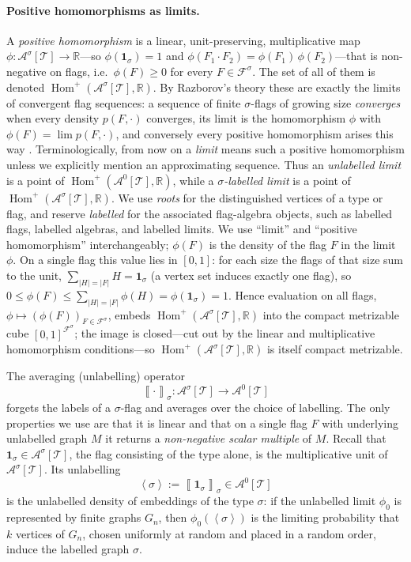 \documentclass[11pt]{article}
\theoremstyle{definition}
\newcommand{\R}{\mathbb{R}}
\newcommand{\A}{\mathcal{A}}
\newcommand{\F}{\mathcal{F}}
\newcommand{\T}{\mathcal{T}}
\newcommand{\Homp}{\operatorname{Hom}^{+}}
\newcommand{\brak}[1]{\left\langle #1\right\rangle}
\newcommand{\avg}[2]{\left\llbracket #1 \right\rrbracket_{#2}}
\newcommand{\one}{\mathbf 1}
\begin{document}
\paragraph{Positive homomorphisms as limits.}
A \emph{positive homomorphism} is a linear, unit-preserving, multiplicative map
$\phi:\A^\sigma[\T]\to\R$---so $\phi(\one_\sigma)=1$ and
$\phi(F_1\cdot F_2)=\phi(F_1)\,\phi(F_2)$---that is non-negative on flags, i.e.\
$\phi(F)\ge0$ for every $F\in\F^\sigma$.  The set of all of them is denoted
$\Homp(\A^\sigma[\T],\R)$.  By Razborov's theory these are exactly the limits of
convergent flag sequences: a sequence of finite $\sigma$-flags of growing size
\emph{converges} when every density $p(F,\cdot)$ converges, its limit is the homomorphism
$\phi$ with $\phi(F)=\lim p(F,\cdot)$, and conversely every positive homomorphism arises
this way \cite[Theorem 3.3]{Razborov2007}.  Terminologically, from now on a
\emph{limit} means such a positive homomorphism unless we explicitly mention an
approximating sequence.  Thus an \emph{unlabelled limit} is a point of
$\Homp(\A^0[\T],\R)$, while a \emph{$\sigma$-labelled limit} is a point of
$\Homp(\A^\sigma[\T],\R)$.  We use \emph{roots} for the distinguished vertices
of a type or flag, and reserve \emph{labelled} for the associated flag-algebra
objects, such as labelled flags, labelled algebras, and labelled limits.  We use
``limit'' and ``positive homomorphism'' interchangeably; $\phi(F)$ is the density of the flag $F$ in
the limit $\phi$.  On a single flag
this value lies in $[0,1]$: for each size the flags of that
size sum to the unit,
$\sum_{|H|=|F|}H=\one_\sigma$ (a vertex set induces exactly one flag), so
$0\le\phi(F)\le\sum_{|H|=|F|}\phi(H)=\phi(\one_\sigma)=1$.  Hence evaluation on all flags,
$\phi\mapsto(\phi(F))_{F\in\F^\sigma}$, embeds $\Homp(\A^\sigma[\T],\R)$ into the compact
metrizable cube $[0,1]^{\F^\sigma}$; the image is closed---cut out by the linear and
multiplicative homomorphism conditions---so $\Homp(\A^\sigma[\T],\R)$ is itself compact
metrizable.

The averaging (unlabelling) operator
\[
  \avg{\cdot}{\sigma}:\A^\sigma[\T]\to\A^0[\T]
\]
forgets the labels of a $\sigma$-flag and averages over the choice of labelling.  The
only properties we use are that it is linear and that on a single flag $F$ with
underlying unlabelled graph $M$ it returns a \emph{non-negative scalar multiple}
of $M$.  Recall that $\one_\sigma\in\A^\sigma[\T]$, the flag consisting of the type alone, is the
multiplicative unit of $\A^\sigma[\T]$.  Its unlabelling
\[
  \brak{\sigma}:=\avg{\one_\sigma}{\sigma}\in\A^0[\T]
\]
is the unlabelled density of embeddings of the type $\sigma$: if the unlabelled limit
$\phi_0$ is represented by finite graphs $G_n$, then $\phi_0(\brak\sigma)$ is the
limiting probability that $k$ vertices of $G_n$, chosen uniformly at random and placed in a
random order, induce the labelled graph $\sigma$.
\end{document}
